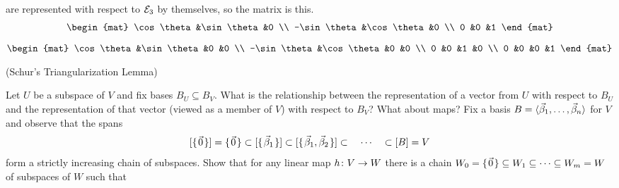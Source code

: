 \begin{exercises}
\begin{answer}
\begin{exparts}
\begin{equation*}
         \end{equation*}
         are represented with respect to ${\cal E}_3$
         by themselves, so the matrix is this.
         \begin{equation*}
            \begin{mat}
              \cos\theta    &\sin\theta  &0   \\
              -\sin\theta   &\cos\theta  &0    \\
              0             &0           &1
            \end{mat}                  
         \end{equation*}
        \partsitem 
            $\begin{mat}
              \cos\theta  &\sin\theta &0 &0 \\
              -\sin\theta  &\cos\theta  &0 &0 \\
              0           &0           &1 &0 \\
              0           &0           &0 &1
            \end{mat}$
      \end{exparts}   
    \end{answer}
  \item (Schur's Triangularization Lemma)%
    \begin{exparts}
      \partsitem Let \( U \) be a subspace of \( V \) and fix bases
        \( B_U\subseteq B_V \).
        What is the relationship between the representation of a vector
        from \( U \) with
        respect to \( B_U \) and the representation of that vector
        (viewed as a member of \( V \)) with
        respect to \( B_V \)?
      \partsitem What about maps?
      \partsitem Fix a basis 
        \( B=\langle\vec{\beta}_1,\dots,\vec{\beta}_n\rangle \)
        for \( V \) and observe that the spans
        \begin{equation*}
          \relax [\mbox{$\{\hspace{0.1em}\vec{0}\hspace{0.1em}\}$}\relax ]=\mbox{$\{\hspace{0.1em}\vec{0}\hspace{0.1em}\}$}\subset\relax [\mbox{$\{\hspace{0.1em}\vec{\beta}_1\hspace{0.1em}\}$}\relax ]
                        \subset\relax [\mbox{$\{\hspace{0.1em}\vec{\beta}_1,\vec{\beta}_2\hspace{0.1em}\}$}\relax ]
               \subset \quad\cdots\quad 
               \subset\relax [B\relax ]=V
        \end{equation*}
        form a strictly increasing chain of subspaces.
        Show that for any linear map \( \mbox{$h\colon V\to W$} \) there is a chain
        \( W_0=\mbox{$\{\hspace{0.1em}\vec{0}\hspace{0.1em}\}$}\subseteq W_1\subseteq \dots \subseteq W_m =W \) of
        subspaces of \( W \) such that 
        \begin{equation*}

\end{equation*}
\end{exparts}
\end{exercises}
